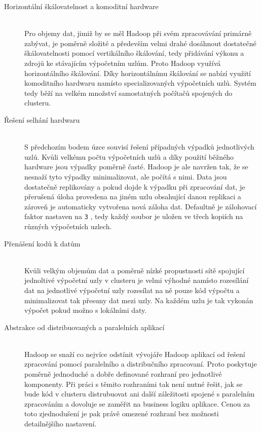 \documentclass[thesis=M,czech]{FITthesis}[2012/06/26]
\begin{document}
\begin{description}

  \item[Horizontální škálovatelnost a komoditní hardware] \hfill \\
  Pro objemy dat, jimiž by se měl Hadoop při svém zpracovávání primárně zabývat, je poměrně složité a především velmi drahé dosáhnout dostatečné škálovatelnosti pomocí vertikálního škálování, tedy přidávání výkonu a zdrojů ke stávajícím výpočetním uzlům. Proto Hadoop využívá horizontálního škálování. Díky horizontálnímu škálování se nabízí využití komoditního hardwaru namísto specializovaných výpočetních uzlů. Systém tedy běží na velkém množství samostatných počítačů spojených do clusteru.
  \item[Řešení selhání hardwaru] \hfill \\
   S předchozím bodem úzce souvisí řešení případných výpadků jednotlivých uzlů. Kvůli velkému počtu výpočetních uzlů a díky použití běžného hardware jsou výpadky poměrně časté. Hadoop je ale navržen tak, že se nesnaží tyto výpadky minimalizovat, ale počítá s nimi. Data jsou dostatečně replikovány a pokud dojde k výpadku při zpracování dat, je přerušená úloha provedena na jiném uzlu obsahující danou replikaci a zároveň je automaticky vytvořena nová záloha dat. Defaultně je zálohovací faktor nastaven na {\texttt{3}} , tedy každý soubor je uložen ve třech kopiích na různých výpočetních uzlech.  
  \item[Přenášení kodů k datům] \hfill \\
  Kvůli velkým objemům dat a poměrně nízké propustnosti sítě spojující jednoltivé výpočetní uzly v clusteru je velmi výhodné namísto rozesílání dat na jednotlivé výpočetní uzly rozesílat na ně pouze kód výpočtu a minimalizovat tak přesuny dat mezi uzly. Na každém uzlu je tak vykonán výpočet pokud možno s lokálními daty.
  \item[Abstrakce od distribuovaných a paralelních aplikací] \hfill \\
  Hadoop se snaží co nejvíce odstínit vývojáře Hadoop aplikací od řešení zpracování pomocí paralelního a distribučního zpracovaní. Proto poskytuje poměrně jednoduché a dobře definované rozhraní pro jednotlivé komponenty. Při práci s těmito rozhraními tak není nutné řešit, jak se bude kód v clusteru distrubuovat ani další záležitosti spojené s paralelním zpracováním a dovoluje se zaměřit na business logiku aplikace. Cenou za toto zjednodušení je pak právě omezené rozhraní bez možnosti detailnějšího nastavení. 

\end{description}
\end{document}
